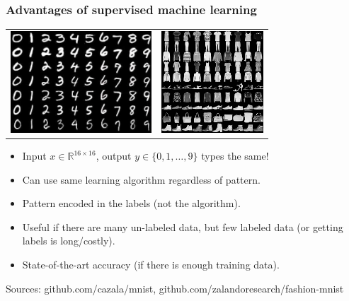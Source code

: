 \documentclass{beamer}
\newcommand{\RR}{\mathbb R}
\begin{document}
\begin{frame}
  \frametitle{Advantages of supervised machine learning}

  \begin{center}
      \begin{tabular}{cc}
        \includegraphics[height=1.5in]{mnist-digits} &
  \includegraphics[height=1.5in]{fashion-mnist-sprite-some}  
  \end{tabular}
  \end{center}
  \vskip -0.2cm
  
  \begin{itemize}
  \item Input $x\in\RR^{16\times 16}$, output $y\in\{0,1,\dots,9\}$ types the same!
  \item Can use same learning algorithm regardless of pattern.
  \item Pattern encoded in the labels (not the algorithm).
  \item Useful if there are many un-labeled data, but few labeled data
    (or getting labels is long/costly).
  \item State-of-the-art accuracy (if there is enough training data).
  \end{itemize}

  \scriptsize Sources: github.com/cazala/mnist, github.com/zalandoresearch/fashion-mnist

\end{frame}
\end{document}

